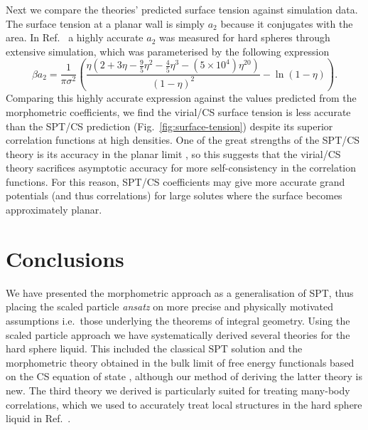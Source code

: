 \documentclass[11pt,twoside]{report}
\begin{document}
Next we compare the theories' predicted surface tension against simulation data.
The surface tension at a planar wall is simply $a_2$ because it conjugates with the area.
In Ref.\ \cite{DavidchackMP2015} a highly accurate $a_2$ was measured for hard spheres through extensive simulation, which was parameterised by the following expression
\begin{equation}\label{eq:quasi-exact-surface-tension}
  \beta a_2
  =
  \frac{1}{\pi \sigma^2} \left(
  \frac{\eta (2 + 3\eta - \frac{9}{5}\eta^2 - \frac{4}{5}\eta^3 - (5 \times 10^4) \eta^{20})}{(1 - \eta)^2}
  - \ln{(1 - \eta)}
  \right).
\end{equation}
Comparing this highly accurate expression against the values predicted from the morphometric coefficients, we find the virial/CS surface tension is less accurate than the SPT/CS prediction (Fig.\ \ref{fig:surface-tension}) despite its superior correlation functions at high densities.
One of the great strengths of the SPT/CS theory is its accuracy in the planar limit \cite{Hansen-GoosJPCM2006}, so this suggests that the virial/CS theory sacrifices asymptotic accuracy for more self-consistency in the correlation functions.
For this reason, SPT/CS coefficients may give more accurate grand potentials (and thus correlations) for large solutes where the surface becomes approximately planar.

\section{Conclusions}

We have presented the morphometric approach as a generalisation of SPT, thus placing the scaled particle \emph{ansatz} on more precise and physically motivated assumptions i.e.\ those underlying the theorems of integral geometry.
Using the scaled particle approach we have systematically derived several theories for the hard sphere liquid.
This included the classical SPT solution and the morphometric theory obtained in the bulk limit of free energy functionals based on the CS equation of state%
,
although our method of deriving the latter theory is new.
The third theory we derived is particularly suited for treating many-body correlations, which we used to accurately treat local structures in the hard sphere liquid in Ref.\ \cite{RobinsonPRL2019}.
\end{document}
